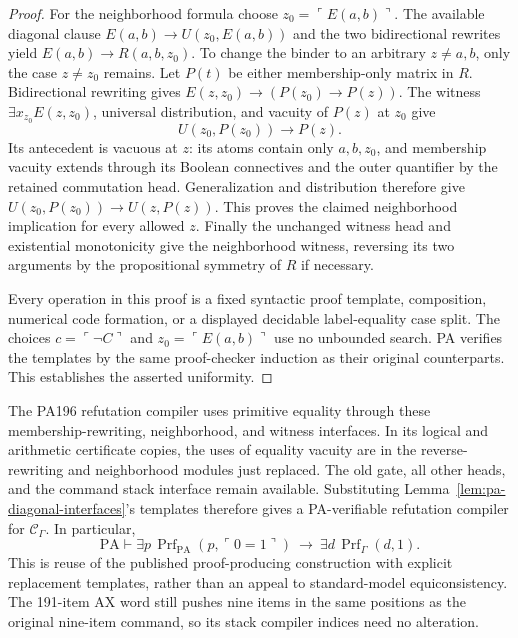 \begin{proof}
For the neighborhood formula choose $z_0=\ulcorner E(a,b)\urcorner$.
The available diagonal clause $E(a,b)\to U(z_0,E(a,b))$ and the two
bidirectional rewrites yield $E(a,b)\to R(a,b,z_0)$.
To change the binder to an arbitrary $z\ne a,b$, only the case
$z\ne z_0$ remains. Let $P(t)$ be either membership-only matrix in
$R$. Bidirectional rewriting gives
$E(z,z_0)\to(P(z_0)\to P(z))$.
The witness $\exists x_{z_0}E(z,z_0)$, universal distribution, and
vacuity of $P(z)$ at $z_0$ give
\[
 U(z_0,P(z_0))\to P(z).
\]
Its antecedent is vacuous at $z$: its atoms contain only
$a,b,z_0$, and membership vacuity extends through its Boolean
connectives and the outer quantifier by the retained commutation head.
Generalization and distribution therefore give
$U(z_0,P(z_0))\to U(z,P(z))$.
This proves the claimed neighborhood implication for every allowed $z$.
Finally the unchanged witness head and existential monotonicity give
the neighborhood witness, reversing its two arguments by the
propositional symmetry of $R$ if necessary.

Every operation in this proof is a fixed syntactic proof template,
composition, numerical code formation, or a displayed decidable
label-equality case split. The choices $c=\ulcorner\neg C\urcorner$ and
$z_0=\ulcorner E(a,b)\urcorner$ use no unbounded search. PA verifies the
templates by the same proof-checker induction as their original
counterparts. This establishes the asserted uniformity.
\end{proof}

The PA196 refutation compiler uses primitive equality through these
membership-rewriting, neighborhood, and witness interfaces. In its
logical and arithmetic certificate copies, the uses of equality vacuity
are in the reverse-rewriting and neighborhood modules just replaced.
The old gate, all other heads, and the command stack interface remain
available. Substituting Lemma~\ref{lem:pa-diagonal-interfaces}'s templates
therefore gives a PA-verifiable refutation compiler for
$\mathcal C_\Gamma$. In particular,
\begin{equation}\label{eq:pa-forward-calculus}
 \mathrm{PA}\vdash
 \exists p\,\operatorname{Prf}_{\mathrm{PA}}(p,\ulcorner0=1\urcorner)
 \ \longrightarrow\
 \exists d\,\operatorname{Prf}_{\Gamma}(d,1).
\end{equation}
This is reuse of the published proof-producing construction with explicit
replacement templates, rather than an appeal to standard-model
equiconsistency. The 191-item AX word still pushes nine items in the
same positions as the original nine-item command, so its stack
compiler indices need no alteration.

